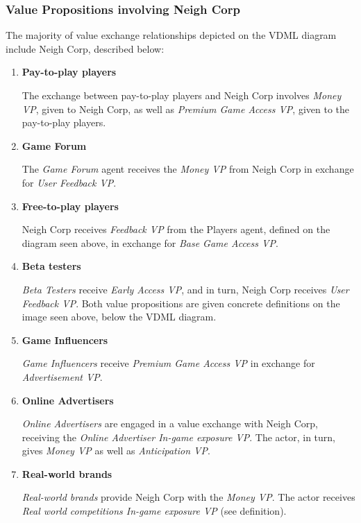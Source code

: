 \documentclass{article}
\begin{document}
\subsubsection{Value Propositions involving Neigh Corp}

The majority of value exchange relationships depicted on the VDML diagram include Neigh Corp, described below:

\begin{enumerate}
    \item \textbf{Pay-to-play players}

    The exchange between pay-to-play players and Neigh Corp involves \textit{Money VP}, given to Neigh Corp, as well as \textit{Premium Game Access VP}, given to the pay-to-play players.

   \item \textbf{Game Forum}

   The \textit{Game Forum} agent receives the \textit{Money VP} from Neigh Corp in exchange for \textit{User Feedback VP}.

    \item \textbf{Free-to-play players}

    Neigh Corp receives \textit{Feedback VP} from the Players agent, defined on the diagram seen above, in exchange for \textit{Base Game Access VP}.

    \item \textbf{Beta testers}

    \textit{Beta Testers} receive \textit{Early Access VP}, and in turn, Neigh Corp receives \textit{User Feedback VP}. Both value propositions are given concrete definitions on the image seen above, below the VDML diagram.

    \item \textbf{Game Influencers}

    \textit{Game Influencers} receive \textit{Premium Game Access VP} in exchange for \textit{Advertisement VP}.

    \item \textbf{Online Advertisers}

    \textit{Online Advertisers} are engaged in a value exchange with Neigh Corp, receiving the \textit{Online Advertiser In-game exposure VP}. The actor, in turn, gives \textit{Money VP} as well as \textit{Anticipation VP}.

    \item \textbf{Real-world brands}

    \textit{Real-world brands} provide Neigh Corp with the \textit{Money VP}. The actor receives \textit{Real world competitions In-game exposure VP} (see definition).


\end{enumerate}
\end{document}

